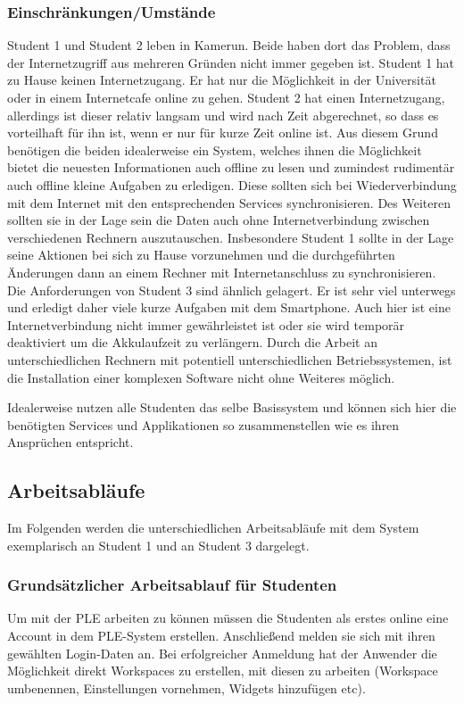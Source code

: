 \subsubsection{Einschränkungen/Umstände}
Student 1 und Student 2 leben in Kamerun. Beide haben dort das Problem, dass der Internetzugriff aus mehreren Gründen nicht immer gegeben ist. Student 1 hat zu Hause keinen Internetzugang. Er hat nur die Möglichkeit in der Universität oder in einem Internetcafe online zu gehen. Student 2 hat einen Internetzugang, allerdings ist dieser relativ langsam und wird nach Zeit abgerechnet, so dass es vorteilhaft für ihn ist, wenn er nur für kurze Zeit online ist. Aus diesem Grund benötigen die beiden idealerweise ein System, welches ihnen die Möglichkeit bietet die neuesten Informationen auch offline zu lesen und zumindest rudimentär auch offline kleine Aufgaben zu erledigen. Diese sollten sich bei Wiederverbindung mit dem Internet mit den entsprechenden Services synchronisieren. Des Weiteren sollten sie in der Lage sein die Daten auch ohne Internetverbindung zwischen verschiedenen Rechnern auszutauschen. Insbesondere Student 1 sollte in der Lage seine Aktionen bei sich zu Hause vorzunehmen und die durchgeführten Änderungen dann an einem Rechner mit Internetanschluss zu synchronisieren. Die Anforderungen von Student 3 sind ähnlich gelagert. Er ist sehr viel unterwegs und erledigt daher viele kurze Aufgaben mit dem Smartphone. Auch hier ist eine Internetverbindung nicht immer gewährleistet ist oder sie wird temporär deaktiviert um die Akkulaufzeit zu verlängern. Durch die Arbeit an unterschiedlichen Rechnern mit potentiell unterschiedlichen Betriebssystemen, ist die Installation einer komplexen Software nicht ohne Weiteres möglich.

Idealerweise nutzen alle Studenten das selbe Basissystem und können sich hier die benötigten Services und Applikationen so zusammenstellen wie es ihren Ansprüchen entspricht.

\subsection{Arbeitsabläufe}
Im Folgenden werden die unterschiedlichen Arbeitsabläufe mit dem System exemplarisch an Student 1 und an Student 3 dargelegt.

\subsubsection{Grundsätzlicher Arbeitsablauf für Studenten}
Um mit der PLE arbeiten zu können müssen die Studenten als erstes online eine Account in dem PLE-System erstellen. Anschließend melden sie sich mit ihren gewählten Login-Daten an. Bei erfolgreicher Anmeldung hat der Anwender die Möglichkeit direkt Workspaces zu erstellen, mit diesen zu arbeiten (Workspace umbenennen, Einstellungen vornehmen, Widgets hinzufügen etc).

